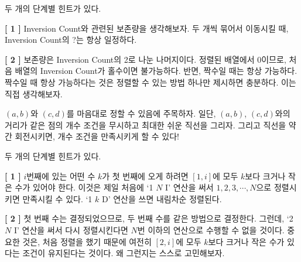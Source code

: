 \begin{hint}
    두 개의 단계별 힌트가 있다.

    \textbf{[ 1 ]} \newline
    Inversion Count와 관련된 보존량을 생각해보자. 두 개씩 묶어서 이동시킬 때, Inversion Count의 ?는 항상 일정하다.

    \textbf{[ 2 ]} \newline
    보존량은 Inversion Count의 2로 나눈 나머지이다. 정렬된 배열에서 0이므로, 처음 배열의 Inversion Count가 홀수이면 불가능하다. 반면, 짝수일 때는 항상 가능하다. 짝수일 때 항상 가능하다는 것은 정렬할 수 있는 방법 하나만 제시하면 충분하다. 이는 직접 생각해보자.
\end{hint}

\begin{hint}
    $(a, b)$와 $(c, d)$를 마음대로 정할 수 있음에 주목하자. 일단, $(a, b)$, $(c, d)$와의 거리가 같은 점의 개수 조건을 무시하고 최대한 쉬운 직선을 그리자. 그리고 직선을 약간 회전시키면, 개수 조건을 만족시키게 할 수 있다!
\end{hint}

\begin{hint}
    두 개의 단계별 힌트가 있다.

    \textbf{[ 1 ]} \newline
    $i$번째에 있는 어떤 수 $k$가 첫 번째에 오게 하려면 $[1, i]$에 모두 $k$보다 크거나 작은 수가 있어야 한다. 이것은 제일 처음에 `1 $N$ I' 연산을 써서 $1, 2, 3, \cdots, N$으로 정렬시키면 만족시킬 수 있다. `1 $k$ D' 연산을 쓰면 내림차순 정렬된다. 

    \textbf{[ 2 ]} \newline
    첫 번째 수는 결정되었으므로, 두 번째 수를 같은 방법으로 결정한다. 그런데, `2 $N$ I' 연산을 써서 다시 정렬시킨다면 $N$번 이하의 연산으로 수행할 수 없을 것이다. 중요한 것은, 처음 정렬을 했기 때문에 여전히 $[2, i]$에 모두 $k$보다 크거나 작은 수가 있다는 조건이 유지된다는 것이다. 왜 그런지는 스스로 고민해보자.
\end{hint}

